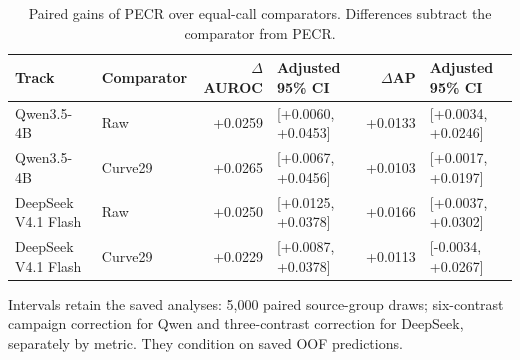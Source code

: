 \begin{table}[t]
\centering\small
\caption{Paired gains of PECR over equal-call comparators. Differences subtract the comparator from PECR.}
\label{tab:primary}
\setlength{\tabcolsep}{4pt}
\begin{tabular}{@{}llrlrl@{}}
\toprule
Track & Comparator & $\Delta$AUROC & Adjusted 95\% CI & $\Delta$AP & Adjusted 95\% CI\\
\midrule
Qwen3.5-4B & Raw & +0.0259 & [+0.0060, +0.0453] & +0.0133 & [+0.0034, +0.0246]\\
Qwen3.5-4B & Curve29 & +0.0265 & [+0.0067, +0.0456] & +0.0103 & [+0.0017, +0.0197]\\
DeepSeek V4.1 Flash & Raw & +0.0250 & [+0.0125, +0.0378] & +0.0166 & [+0.0037, +0.0302]\\
DeepSeek V4.1 Flash & Curve29 & +0.0229 & [+0.0087, +0.0378] & +0.0113 & [-0.0034, +0.0267]\\
\bottomrule
\end{tabular}
\par\vspace{3pt}\begin{minipage}{\textwidth}\footnotesize Intervals retain the saved analyses: 5,000 paired source-group draws; six-contrast campaign correction for Qwen and three-contrast correction for DeepSeek, separately by metric. They condition on saved OOF predictions.\end{minipage}
\end{table}
